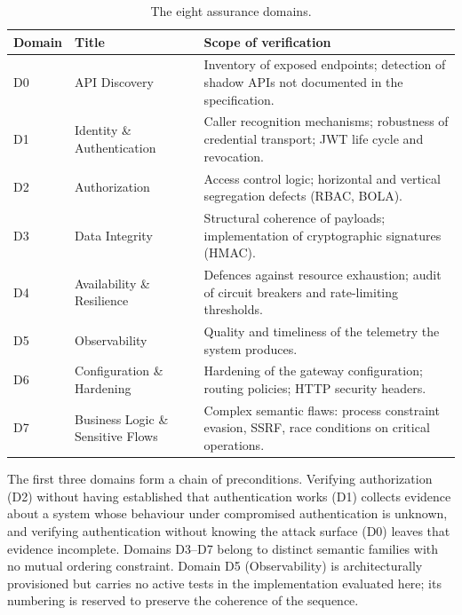 \begin{table}
  \caption{The eight assurance domains.}
  \label{tab:domains}
  \begin{tabular}{p{} p{} p{}}
    \toprule
    \textbf{Domain} & \textbf{Title}                    & \textbf{Scope of verification}                                                                    \\
    \midrule
    D0              & API Discovery                     & Inventory of exposed endpoints; detection of shadow APIs not documented in the specification.     \\
    D1              & Identity \& Authentication        & Caller recognition mechanisms; robustness of credential transport; JWT life cycle and revocation. \\
    D2              & Authorization                     & Access control logic; horizontal and vertical segregation defects (RBAC, BOLA).                   \\
    D3              & Data Integrity                    & Structural coherence of payloads; implementation of cryptographic signatures (HMAC).              \\
    D4              & Availability \& Resilience        & Defences against resource exhaustion; audit of circuit breakers and rate-limiting thresholds.     \\
    D5              & Observability                     & Quality and timeliness of the telemetry the system produces.                                      \\
    D6              & Configuration \& Hardening        & Hardening of the gateway configuration; routing policies; HTTP security headers.                  \\
    D7              & Business Logic \& Sensitive Flows & Complex semantic flaws: process constraint evasion, SSRF, race conditions on critical operations. \\
    \bottomrule
  \end{tabular}
\end{table}

The first three domains form a chain of preconditions.
Verifying authorization (D2) without having established that authentication works (D1) collects evidence about a system whose behaviour under compromised authentication is unknown, and verifying authentication without knowing the attack surface (D0) leaves that evidence incomplete.
Domains D3--D7 belong to distinct semantic families with no mutual ordering constraint.
Domain D5 (Observability) is architecturally provisioned but carries no active tests in the implementation evaluated here; its numbering is reserved to preserve the coherence of the sequence.

